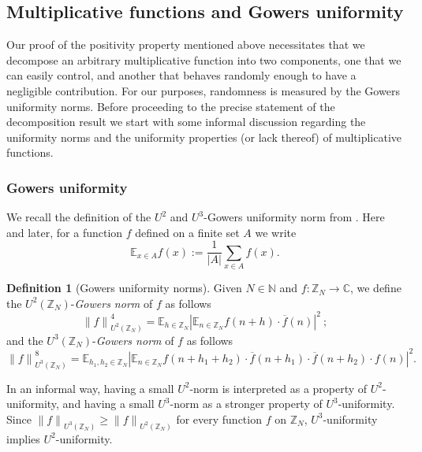 \documentclass[11pt]{amsart}
\theoremstyle{definition}
\newtheorem*{definition}{Definition}
\begin{document}
\subsection{Multiplicative functions and Gowers uniformity}
Our  proof of the positivity property mentioned
above necessitates that we decompose an arbitrary multiplicative
function into two components, one that we can easily control,  and
another that behaves randomly enough to have a negligible
contribution. For our purposes, 
randomness  
is  measured by the Gowers uniformity norms. Before proceeding to
the precise statement of the decomposition result we start with some
informal discussion regarding the uniformity norms and the
uniformity properties (or lack thereof) of multiplicative functions.

\subsubsection*{Gowers uniformity}
We recall the definition of the   $U^2$ and  $U^3$-Gowers uniformity
norm from \cite{G01}. Here and later, for a function $f$  defined on
a finite set $A$ we write
$$
{{\mathbb E}}_{x\in A}f(x):=\frac 1{|A|}\sum_{x\in A}f(x).
$$
\begin{definition}[Gowers uniformity norms]
Given   $ N\in{{\mathbb N}}$ and $f\colon {{\mathbb Z}}_N\to {{\mathbb C}}$, we define the
$U^2({{\mathbb Z}}_N)$-\emph{Gowers norm}  of $f$ as follows
$$
{\lVert {f} \rVert}_{U^{2}({{\mathbb Z}}_N)}^4={{\mathbb E}}_{h\in {{\mathbb Z}}_N}|{{\mathbb E}}_{n\in {{\mathbb Z}}_N}f(n+h)\cdot
\overline{f}(n)|^2\ ;
$$
and the  $U^3({{\mathbb Z}}_N)$-\emph{Gowers norm} of $f$  as follows
$$
{\lVert {f} \rVert}_{U^{3}({{\mathbb Z}}_N)}^8={{\mathbb E}}_{h_1,h_2\in {{\mathbb Z}}_N}|{{\mathbb E}}_{n\in
{{\mathbb Z}}_N}f(n+h_1+h_2)\cdot \overline{f}(n+h_1)\cdot
\overline{f}(n+h_2)\cdot f(n)|^2.
$$
\end{definition}
 In an informal way, having a small $U^2$-norm is interpreted as a
property of $U^2$-uniformity, and having a small $U^3$-norm as a
stronger property of $U^3$-uniformity. Since ${\lVert f \rVert}_{U^3({{\mathbb Z}}_N)}\geq{\lVert f \rVert}_{U^2({{\mathbb Z}}_N)}$ for every function $f$ on
${{\mathbb Z}}_N$, $U^3$-uniformity implies $U^2$-uniformity.
\end{document}
